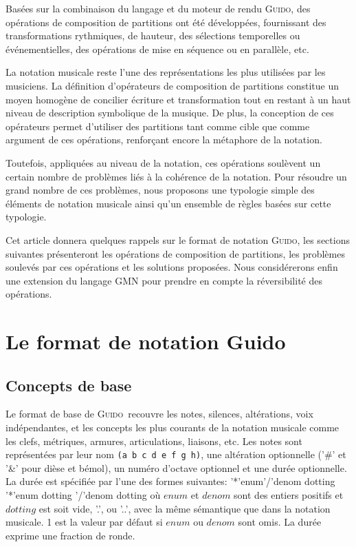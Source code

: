 \documentclass{article}
\newenvironment{gmncode}		{\vspace{-2mm}\small\verbatim}{\endverbatim\vspace{-2mm}}
\newcommand{\Guido}		{\textsc{Guido}}
\begin{document}
Basées sur la combinaison du langage et du moteur de rendu \Guido , des opérations de composition de partitions ont été développées, fournissant des transformations rythmiques, de hauteur, des sélections temporelles ou événementielles, des opérations de mise en séquence ou en parallèle, etc.

La notation musicale reste l'une des représentations les plus utilisées par les musiciens. La définition d'opérateurs de composition de partitions constitue un moyen homogène de concilier écriture et transformation tout en restant à un haut niveau de description symbolique de la musique. De plus, la conception de ces opérateurs permet d'utiliser des partitions tant comme cible que comme argument de ces opérations, renforçant encore la métaphore de la notation.

Toutefois, appliquées au niveau de la notation, ces opérations soulèvent un certain nombre de problèmes liés à la cohérence de la notation. Pour résoudre un grand nombre de ces problèmes, nous proposons une typologie simple des éléments de notation musicale ainsi qu'un ensemble de règles basées sur cette typologie.

Cet article donnera quelques rappels sur le format de notation \Guido , les sections suivantes présenteront les opérations de composition de partitions, les problèmes soulevés par ces opérations et les solutions proposées. Nous considérerons enfin une extension du langage GMN pour prendre  en compte la réversibilité des opérations.

\section{Le format de notation Guido}

\subsection{Concepts de base}
Le format de base de \Guido\ recouvre les notes, silences, altérations, voix indépendantes, et les concepts les plus courants de la notation musicale comme les clefs, métriques, armures, articulations, liaisons, etc.
Les notes sont représentées par leur nom \texttt{(a b c d e f g h)}, une altération optionnelle ('\#' et '\&' pour dièse et bémol), un numéro d'octave optionnel et une durée optionnelle. \\
La durée est spécifiée par l'une des formes suivantes: 
\begin{gmncode} 
   '*'enum'/'denom dotting
   '*'enum dotting 
   '/'denom dotting
\end{gmncode} 
\noindent où $enum$ et $denom$ sont des entiers positifs et $dotting$ est soit vide, '.', ou '..', avec la même sémantique que dans la notation musicale. 1 est la valeur par défaut si $enum$ ou $denom$ sont omis. La durée exprime une fraction de ronde.
\end{document}
